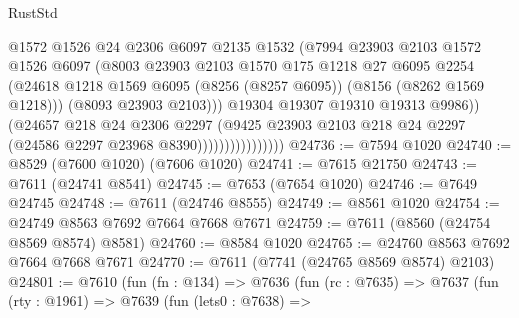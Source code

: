 \begin{lexlean}{RustStd}
\begin{coremodule}
{\begin{coremodule}
{{{{{{{{{{{{{{{{{{{{{{{{{{{{{{{{{{                                  @1572
                                  @1526
                                  @24
                                  @2306
                                  @6097
                                  @2135
                                  @1532
                                  (@7994
                                    @23903
                                    @2103
                                    @1572
                                    @1526
                                    @6097
                                    (@8003
                                      @23903
                                      @2103
                                      @1570
                                      @175
                                      @1218
                                      @27
                                      @6095
                                      @2254
                                      (@24618
                                        @1218
                                        @1569
                                        @6095
                                        (@8256 (@8257 @6095))
                                        (@8156 (@8262 @1569 @1218)))
                                      (@8093 @23903 @2103)))
                                  @19304
                                  @19307
                                  @19310
                                  @19313
                                  @9986))
                              (@24657
                                @218
                                @24
                                @2306
                                @2297
                                (@9425
                                  @23903
                                  @2103
                                  @218
                                  @24
                                  @2297
                                  (@24586 @2297 @23968 @8390))))))))))))))))
@24736 := @7594 @1020
@24740 := @8529 (@7600 @1020) (@7606 @1020)
@24741 := @7615 @21750
@24743 := @7611 (@24741 @8541)
@24745 := @7653 (@7654 @1020)
@24746 := @7649 @24745
@24748 := @7611 (@24746 @8555)
@24749 := @8561 @1020
@24754 := @24749 @8563 @7692 @7664 @7668 @7671
@24759 := @7611 (@8560 (@24754 @8569 @8574) @8581)
@24760 := @8584 @1020
@24765 := @24760 @8563 @7692 @7664 @7668 @7671
@24770 := @7611 (@7741 (@24765 @8569 @8574) @2103)
@24801 := @7610
    (fun (fn : @134) =>
    @7636
      (fun (rc : @7635) =>
      @7637
        (fun (rty : @1961) =>
        @7639
          (fun (lets0 : @7638) =>
}}}}}}}}}}}}}}}}}}}}}}}}}}}}}}}}}}
\end{coremodule}}
\end{coremodule}
\end{lexlean}
